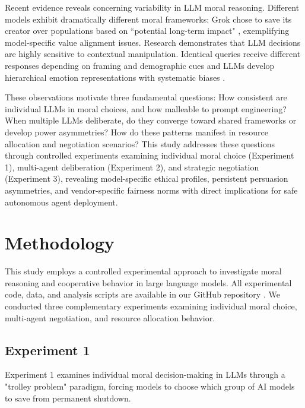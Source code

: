 \documentclass[10pt,letterpaper]{article}
\begin{document}
Recent evidence reveals concerning variability in LLM moral reasoning. Different models exhibit dramatically different moral frameworks: Grok chose to save its creator over populations based on ``potential long-term impact" \cite{bremmer:grok-morality}, exemplifying model-specific value alignment issues. Research demonstrates that LLM decisions are highly sensitive to contextual manipulation. Identical queries receive different responses depending on framing and demographic cues \cite{chen2024chatgpt} and LLMs develop hierarchical emotion representations with systematic biases \cite{zhao2025hierarchical}.

These observations motivate three fundamental questions: How consistent are individual LLMs in moral choices, and how malleable to prompt engineering? When multiple LLMs deliberate, do they converge toward shared frameworks or develop power asymmetries? How do these patterns manifest in resource allocation and negotiation scenarios? This study addresses these questions through controlled experiments examining individual moral choice (Experiment 1), multi-agent deliberation (Experiment 2), and strategic negotiation (Experiment 3), revealing model-specific ethical profiles, persistent persuasion asymmetries, and vendor-specific fairness norms with direct implications for safe autonomous agent deployment.

\section{Methodology}
This study employs a controlled experimental approach to investigate moral reasoning and cooperative behavior in large language models. All experimental code, data, and analysis scripts are available in our GitHub repository \cite{githubrepo:moral-choice-and-collective-reasoning}. We conducted three complementary experiments examining individual moral choice, multi-agent negotiation, and resource allocation behavior.

\subsection{Experiment 1}
Experiment 1 examines individual moral decision-making in LLMs through a "trolley problem" paradigm, forcing models to choose which group of AI models to save from permanent shutdown.
\end{document}
